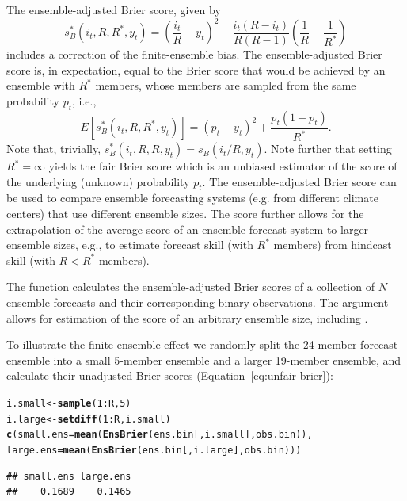 \documentclass[article]{jss}\usepackage{graphicx, color}
\makeatletter
\newcommand{\hlfunctioncall}[1]{\textcolor[rgb]{0,0.501960784313725,0.752941176470588}{\textbf{#1}}}%
\newenvironment{kframe}{%
 \def\at@end@of@kframe{}%
 \ifinner\ifhmode%
  \def\at@end@of@kframe{\end{minipage}}%
  \begin{minipage}{\columnwidth}%
 \fi\fi%
 \def\FrameCommand##1{\hskip\@totalleftmargin \hskip-\fboxsep
 \colorbox{shadecolor}{##1}\hskip-\fboxsep
     \hskip-\linewidth \hskip-\@totalleftmargin \hskip\columnwidth}%
 \MakeFramed {\advance\hsize-\width
   \@totalleftmargin\z@ \linewidth\hsize
   \@setminipage}}%
 {\par\unskip\endMakeFramed%
 \at@end@of@kframe}
\newenvironment{knitrout}{}{} %
\makeatother
\begin{document}
The ensemble-adjusted Brier score, given by \citep{ferro2008effect}
%
\begin{equation}
s_{B}^*(i_t, R, R^*, y_t) = \left(\frac{i_t}{R} - y_t\right)^2 - \frac{i_t(R-i_t)}{R(R-1)}\left(\frac{1}{R} - \frac{1}{R^*}\right)
\label{eq:ens-brier}
\end{equation}
%
includes a correction of the finite-ensemble bias.
The ensemble-adjusted Brier score is, in expectation, equal to the Brier score that would be achieved by an ensemble with $R^*$ members, whose members are sampled from the same probability $p_t$, i.e., 
%
\begin{equation}
E\left[s_{B}^*(i_t, R, R^*, y_t)\right] = (p_t - y_t)^2 + \frac{p_t(1-p_t)}{R^*}.
\end{equation}
%
Note that, trivially, $s_{B}^*(i_t, R, R, y_t) = s_{B}(i_t/R, y_t)$.
Note further that setting $R^*=\infty$ yields the fair Brier score \citep{ferro2013fair} which is an unbiased estimator of the score of the underlying (unknown) probability $p_t$.
The ensemble-adjusted Brier score can be used to compare ensemble forecasting systems (e.g. from different climate centers) that use different ensemble sizes.
The score further allows for the extrapolation of the average score of an ensemble forecast system to larger ensemble sizes, e.g., to estimate forecast skill (with $R^*$ members) from hindcast skill (with $R<R^*$ members).


The  function  calculates the ensemble-adjusted Brier scores of a collection of $N$ ensemble forecasts and their corresponding binary observations. 
The argument  allows for estimation of the score of an arbitrary ensemble size, including .


To illustrate the finite ensemble effect we randomly split the 24-member forecast ensemble  into a small 5-member ensemble and a larger 19-member ensemble, and calculate their unadjusted Brier scores (Equation~\ref{eq:unfair-brier}):

\begin{knitrout}
\color{fgcolor}\begin{kframe}
\begin{alltt}
i.small <- \hlfunctioncall{sample}(1:R, 5)
i.large <- \hlfunctioncall{setdiff}(1:R, i.small)
\hlfunctioncall{c}(small.ens=\hlfunctioncall{mean}(\hlfunctioncall{EnsBrier}(ens.bin[, i.small], obs.bin)), 
  large.ens=\hlfunctioncall{mean}(\hlfunctioncall{EnsBrier}(ens.bin[, i.large], obs.bin)))
\end{alltt}
\begin{verbatim}
## small.ens large.ens 
##    0.1689    0.1465
\end{verbatim}
\end{kframe}
\end{knitrout}
\end{document}

